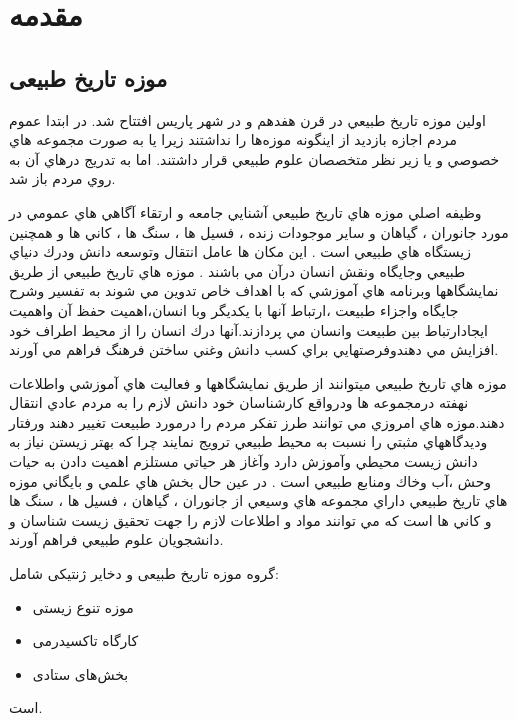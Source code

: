 
\chapter{مقدمه} \label{chapter:introduction}

\paragraph*{}

\section{موزه تاریخ طبیعی}
اولين موزه تاريخ طبيعي در قرن
هفدهم و در شهر پاريس افتتاح شد.
در ابتدا عموم مردم اجازه بازديد از اينگونه موزه‌ها را نداشتند زيرا يا به
صورت مجموعه هاي خصوصي و يا زير نظر متخصصان علوم طبيعي قرار داشتند. اما به تدريج درهاي آن به
روي مردم باز شد.

وظيفه اصلي موزه هاي تاريخ طبيعي آشنايي جامعه و ارتقاء آگاهي هاي عمومي در مورد جانوران ، گياهان و 
ساير موجودات زنده ، فسيل ها ، سنگ ها ، كاني ها و همچنين زيستگاه هاي طبيعي است . اين مكان ها 
عامل انتقال وتوسعه دانش ودرك دنياي طبيعي وجايگاه ونقش انسان درآن مي باشند . موزه هاي تاريخ طبيعي
از طريق نمايشگاهها وبرنامه هاي آموزشي كه با اهداف خاص تدوين مي شوند به تفسير وشرح جايگاه واجزاء
طبيعت ،ارتباط آنها با يكديگر وبا انسان،اهميت حفظ آن واهميت ايجادارتباط بين طبيعت وانسان مي
پردازند.آنها درك انسان را از محيط اطراف خود افزايش مي دهندوفرصتهايي براي كسب دانش وغني ساختن
فرهنگ فراهم مي آورند.

موزه هاي تاريخ طبيعي ميتوانند از طريق نمايشگاهها و فعاليت هاي آموزشي واطلاعات
نهفته درمجموعه ها ودرواقع كارشناسان خود دانش لازم را به مردم عادي انتقال دهند.موزه هاي امروزي مي
توانند طرز تفكر مردم را درمورد طبيعت تغيير دهند ورفتار وديدگاههاي مثبتي را نسبت به محيط طبيعي
ترويج نمايند چرا كه بهتر زيستن نياز به دانش زيست محيطي وآموزش دارد وآغاز هر حياتي مستلزم اهميت
دادن به حيات وحش ،آب وخاك ومنابع طبيعي است . در عين حال بخش هاي علمي و بايگاني موزه هاي تاريخ
طبيعي داراي مجموعه هاي وسيعي از جانوران ، گياهان ، فسيل ها ، سنگ ها و كاني ها است كه مي توانند مواد
و اطلاعات لازم را جهت تحقيق زيست شناسان و دانشجويان علوم طبيعي فراهم آورند.


\newpage

گروه موزه تاریخ طبیعی و دخایر ژنتیکی شامل:
\begin{itemize}
    \item موزه تنوع زیستی
    \item کارگاه تاکسیدرمی
    \item بخش‌های ستادی
\end{itemize}
است.

